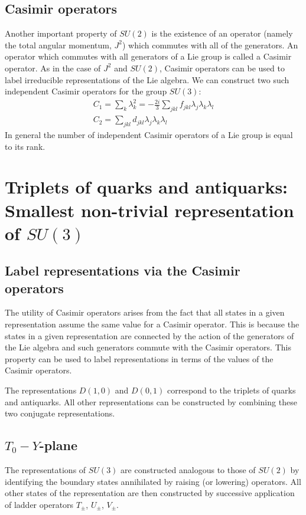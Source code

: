 \documentclass[main.tex]{subfiles}
\begin{document}
\subsection{Casimir operators}
Another important property of $SU(2)$ is the existence of an operator (namely the total angular momentum, $J^2$) which commutes with all of the generators. An operator which commutes with all generators of a Lie group is called a Casimir operator. As in the case of $J^2$ and $SU(2)$, Casimir operators can be used to label irreducible representations of the Lie algebra. We can construct two such independent Casimir operators for the group $SU(3)$:
\begin{align*}
C_1=\sum_k\lambda_k^2=-\frac{2i}{3}\sum_{jkl}f_{jkl}\lambda_j\lambda_k\lambda_l\\
C_2=\sum_{jkl}d_{jkl}\lambda_j\lambda_k\lambda_l
\end{align*}
In general the number of independent Casimir operators of a Lie group is equal to its rank.

\section{Triplets of quarks and antiquarks: Smallest non-trivial representation of $SU(3)$}

\subsection{Label representations via the Casimir operators}
The utility of Casimir operators arises from the fact that all states in a given representation assume the same value for a Casimir operator. This is because the states in a given representation are connected by the action of the generators of the Lie algebra and such generators commute with the Casimir operators. This property can be used to label representations in terms of the values of the Casimir operators.

 The representations $D(1,0)$ and $D(0,1)$ correspond to the triplets of quarks and antiquarks. All other representations can be constructed by combining these two conjugate representations. 


\subsection{$T_0-Y$-plane}

The representations of $SU(3)$ are constructed analogous to those of $SU(2)$ by identifying the boundary states annihilated by raising (or lowering) operators. All other states of the representation are then constructed by successive application of ladder operators $T_{\pm}$,  $U_{\pm}$, $V_{\pm}$.
\end{document}
